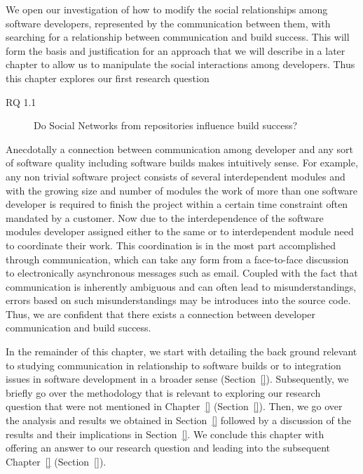 \label{chap:soc-net}
We open our investigation of how to modify the social relationships among software developers, represented by the communication between them, with searching for a relationship between communication and build success.
This will form the basis and justification for an approach that we will describe in a later chapter to allow us to manipulate the social interactions among developers.
Thus this chapter explores our first research question
\begin{description}
\item[RQ 1.1] Do Social Networks from repositories influence build success?
\end{description}

Anecdotally a connection between communication among developer and any sort of software quality including software builds makes intuitively sense.
For example, any non trivial software project consists of several interdependent modules and with the growing size and number of modules the work of more than one software developer is required to finish the project within a certain time constraint often mandated by a customer.
Now due to the interdependence of the software modules developer assigned either to the same or to interdependent module need to coordinate their work.
This coordination is in the most part accomplished through communication, which can take any form from a face-to-face discussion to electronically asynchronous messages such as email.
Coupled with the fact that communication is inherently ambiguous and can often lead to misunderstandings, errors based on such misunderstandings may be introduces into the source code.
Thus, we are confident that there exists  a connection between developer communication and build success.

In the remainder of this chapter, we start with detailing the back ground relevant to studying communication in relationship to software builds or to integration issues in software development in a broader sense (Section~\ref{}).
Subsequently, we briefly go over the methodology that is relevant to exploring our research question that were not mentioned in Chapter~\ref{} (Section~\ref{}).
Then, we go over the analysis and results we obtained in Section~\ref{} followed by a discussion of the results and their implications in Section~\ref{}.
We conclude this chapter with offering an answer to our research question and leading into the subsequent Chapter~\ref{} (Section~\ref{}).

